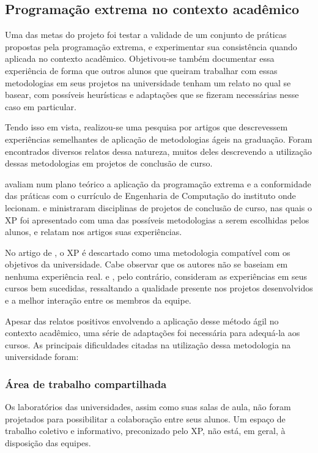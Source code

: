 	\subsection{Programação extrema no contexto acadêmico}\label{xp_e_universidade}
    Uma das metas do projeto foi testar a validade de um conjunto de práticas propostas pela programação extrema, e experimentar sua consistência quando aplicada no contexto acadêmico. Objetivou-se também documentar essa experiência de forma que outros alunos que queiram trabalhar com essas metodologias em seus projetos na universidade tenham um relato no qual se basear, com possíveis heurísticas e adaptações que se fizeram necessárias nesse caso em particular.

    Tendo isso em vista, realizou-se uma pesquisa por artigos que descrevessem experiências semelhantes de aplicação de metodologias ágeis na graduação. Foram encontrados diversos relatos dessa natureza, muitos deles descrevendo a utilização dessas metodologias em projetos de conclusão de curso.

     avaliam num plano teórico a aplicação da programação extrema e a conformidade das práticas com o currículo de Engenharia de Computação do instituto onde lecionam.  e  ministraram disciplinas de projetos de conclusão de curso, nas quais o XP foi apresentado com uma das possíveis metodologias a serem escolhidas pelos alunos, e relatam nos artigos suas experiências.

    No artigo de , o XP é descartado como uma metodologia compatível com os objetivos da universidade. Cabe observar que os autores não se baseiam em nenhuma experiência real.  e , pelo contrário, consideram as experiências em seus cursos bem sucedidas, ressaltando a qualidade presente nos projetos desenvolvidos e a melhor interação entre os membros da equipe.

    Apesar das relatos positivos envolvendo a aplicação desse método ágil no contexto acadêmico, uma série de adaptações foi necessária para adequá-la aos cursos. As principais dificuldades citadas na utilização dessa metodologia na universidade foram:

    \subsubsection{Área de trabalho compartilhada}
      Os laboratórios das universidades, assim como suas salas de aula, não foram projetados para possibilitar a colaboração entre seus alunos. Um espaço de trabalho coletivo e informativo, preconizado pelo XP, não está, em geral, à disposição das equipes.

